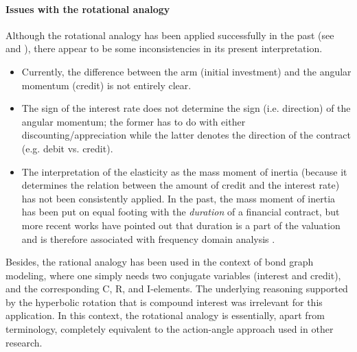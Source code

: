 \paragraph{Issues with the rotational analogy} Although the rotational analogy has been applied successfully in the past (see \citet{Kruimer2021} and \citet{VanArdenne2020}), there appear to be some inconsistencies in its present interpretation. 
\begin{itemize}
    \item Currently, the difference between the arm (initial investment) and the angular momentum (credit) is not entirely clear.
    \item The sign of the interest rate does not determine the sign (i.e. direction) of the angular momentum; the former has to do with either discounting/appreciation while the latter denotes the direction of the contract (e.g. debit vs. credit).
    \item The interpretation of the elasticity as the mass moment of inertia (because it determines the relation between the amount of credit and the interest rate) has not been consistently applied. In the past, the mass moment of inertia has been put on equal footing with the \emph{duration} of a financial contract, but more recent works have pointed out that duration is a part of the valuation and is therefore associated with frequency domain analysis \cite{Krabbenborg2021}.
\end{itemize}
Besides, the rational analogy has been used in the context of bond graph modeling, where one simply needs two conjugate variables (interest and credit), and the corresponding C, R, and I-elements. The underlying reasoning supported by the hyperbolic rotation that is compound interest was irrelevant for this application. In this context, the rotational analogy is essentially, apart from terminology, completely equivalent to the action-angle approach used in other research.


